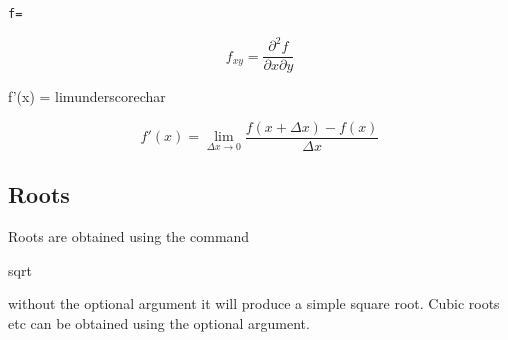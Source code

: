 
\begin{code}
\begin{alltt}
  f = 
\end{alltt}
\end{code}%
\begin{resultS}[Image: f subscript xy = partial d 2 f by partial d x partial d y.]
\[
f_{xy} = \frac{\partial^2 f}{\partial x \partial y}
\]
\end{resultS}

\begin{code}
\newline
\mbox{}\qquad f'(x) = \gls{lim}\gls{underscorechar}\newline
\mbox{}\qquad {}\newline
{}
\end{code}
\begin{resultS}
\[
f'(x) = \lim_{\Delta x\to0}
  \frac{f(x+\Delta x) - f(x)}{\Delta x}
\]
\end{resultS}


\subsection{Roots}
\label{sec:roots}

Roots are obtained using the command
\begin{definition}
\gls{sqrt}
\end{definition}%
without the optional argument 
it will produce a simple square root. Cubic roots etc
can be obtained using the optional argument.


